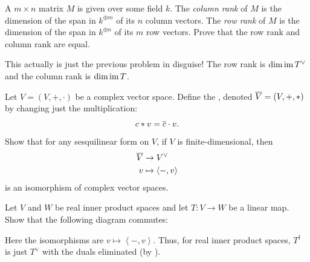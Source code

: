 \begin{dproblem}
	\label{prob:row_rank_column_rank}
	A $m \times n$ matrix $M$ is given over some field $k$.
	The \emph{column rank} of $M$ is the dimension of the span in $k^{\oplus m}$
	of its $n$ column vectors.
	The \emph{row rank} of $M$ is the dimension of the span in $k^{\oplus n}$
	of its $m$ row vectors.
	Prove that the row rank and column rank are equal.
	\begin{hint}
		This actually is just the previous problem in disguise!
		The row rank is $\dim \operatorname{im} T^\vee$
		and the column rank is $\dim \operatorname{im} T$.
	\end{hint}
\end{dproblem}

\begin{problem}
	\label{prob:complex_conj_space}
	Let $V = (V, +, \cdot)$ be a complex vector space.
	Define the ,
	denoted $\overline V = (V, +, \ast)$
	by changing just the multiplication:
	\[ c \ast v = \overline c \cdot v. \]
	Show that for any sesquilinear form on $V$,
	if $V$ is finite-dimensional, then
	\begin{align*}
		\overline V & \to V^\vee \\
		v &\mapsto \left< -, v \right>
	\end{align*}
	is an isomorphism of complex vector spaces.
\end{problem}

\begin{problem}
	Let $V$ and $W$ be real inner product spaces
	and let $T \colon V \to W$ be a linear map.
	Show that the following diagram commutes:
	\begin{center}
	\end{center}
	Here the isomorphisms are $v \mapsto \left< -, v\right>$.
	Thus, for real inner product spaces,
	$T^\dagger$ is just $T^\vee$ with the duals eliminated
	(by ).
\end{problem}

